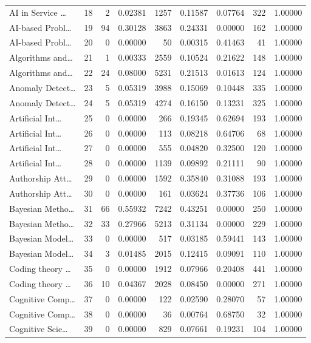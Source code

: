 \begin{table}
\begin{tabular}{lrrrrrrrr}
AI in Service … & 18 & 2 & 0.02381 & 1257 & 0.11587 & 0.07764 & 322 & 1.00000 \\
AI-based Probl… & 19 & 94 & 0.30128 & 3863 & 0.24331 & 0.00000 & 162 & 1.00000 \\
AI-based Probl… & 20 & 0 & 0.00000 & 50 & 0.00315 & 0.41463 & 41 & 1.00000 \\
Algorithms and… & 21 & 1 & 0.00333 & 2559 & 0.10524 & 0.21622 & 148 & 1.00000 \\
Algorithms and… & 22 & 24 & 0.08000 & 5231 & 0.21513 & 0.01613 & 124 & 1.00000 \\
Anomaly Detect… & 23 & 5 & 0.05319 & 3988 & 0.15069 & 0.10448 & 335 & 1.00000 \\
Anomaly Detect… & 24 & 5 & 0.05319 & 4274 & 0.16150 & 0.13231 & 325 & 1.00000 \\
Artificial Int… & 25 & 0 & 0.00000 & 266 & 0.19345 & 0.62694 & 193 & 1.00000 \\
Artificial Int… & 26 & 0 & 0.00000 & 113 & 0.08218 & 0.64706 & 68 & 1.00000 \\
Artificial Int… & 27 & 0 & 0.00000 & 555 & 0.04820 & 0.32500 & 120 & 1.00000 \\
Artificial Int… & 28 & 0 & 0.00000 & 1139 & 0.09892 & 0.21111 & 90 & 1.00000 \\
Authorship Att… & 29 & 0 & 0.00000 & 1592 & 0.35840 & 0.31088 & 193 & 1.00000 \\
Authorship Att… & 30 & 0 & 0.00000 & 161 & 0.03624 & 0.37736 & 106 & 1.00000 \\
Bayesian Metho… & 31 & 66 & 0.55932 & 7242 & 0.43251 & 0.00000 & 250 & 1.00000 \\
Bayesian Metho… & 32 & 33 & 0.27966 & 5213 & 0.31134 & 0.00000 & 229 & 1.00000 \\
Bayesian Model… & 33 & 0 & 0.00000 & 517 & 0.03185 & 0.59441 & 143 & 1.00000 \\
Bayesian Model… & 34 & 3 & 0.01485 & 2015 & 0.12415 & 0.09091 & 110 & 1.00000 \\
Coding theory … & 35 & 0 & 0.00000 & 1912 & 0.07966 & 0.20408 & 441 & 1.00000 \\
Coding theory … & 36 & 10 & 0.04367 & 2028 & 0.08450 & 0.00000 & 271 & 1.00000 \\
Cognitive Comp… & 37 & 0 & 0.00000 & 122 & 0.02590 & 0.28070 & 57 & 1.00000 \\
Cognitive Comp… & 38 & 0 & 0.00000 & 36 & 0.00764 & 0.68750 & 32 & 1.00000 \\
Cognitive Scie… & 39 & 0 & 0.00000 & 829 & 0.07661 & 0.19231 & 104 & 1.00000 \\

\end{tabular}
\end{table}

